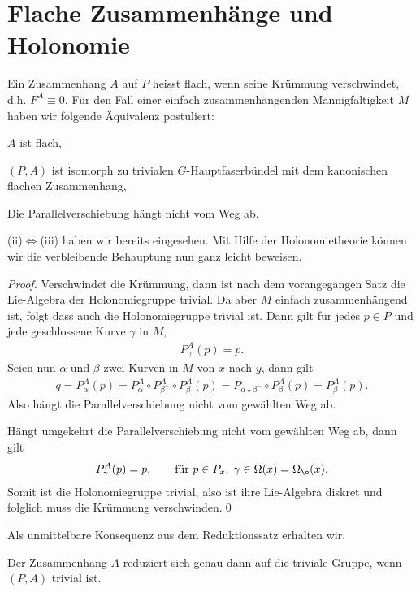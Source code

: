 \documentclass[%
	paper=a5,%
	fleqn,%
	DIV=18,%
	BCOR=0mm,
	fontsize=11pt,
	titlepage=false,%
	bibliography=totoc,
	DIV=18,%
	twoside=true,
	pdftitle=Riemannsche Geometrie,
	pdfauthor=Uwe Semmelmann,
	numbers=noendperiod]%
	{scrbook}
\begin{document}
\section{Flache Zusammenhänge und Holonomie}

Ein Zusammenhang $A$ auf $P$ heisst flach, wenn seine Krümmung verschwindet, d.h. $F^A\equiv 0$. 
Für den Fall einer einfach zusammenhängenden Mannigfaltigkeit $M$ haben wir folgende Äquivalenz postuliert:
\begin{equivenum}
\item $A$ ist flach,
\item $(P,A)$ ist isomorph zu trivialen $G$-Hauptfaserbündel  mit dem kanonischen flachen Zusammenhang,
\item Die Parallelverschiebung hängt nicht vom Weg ab.
\end{equivenum}

(ii)$\iff$(iii) haben wir bereits eingesehen. Mit Hilfe der Holonomietheorie können wir die verbleibende Behauptung nun ganz leicht beweisen.
\begin{proof}
Verschwindet die Krümmung, dann ist nach dem vorangegangen Satz die Lie-Algebra der Holonomiegruppe trivial. Da aber $M$ einfach zusammenhängend ist, folgt dass auch die Holonomiegruppe trivial ist. Dann gilt für jedes $p\in P$ und jede geschlossene Kurve $\gamma$ in $M$, 
\begin{align*}
P_{\gamma}^A(p) = p.
\end{align*}
Seien nun $\alpha$ und $\beta$ zwei Kurven in $M$ von $x$ nach $y$, dann gilt
\begin{align*}
q = P_{\alpha}^A(p) = P_{\alpha}^A\circ P_{\beta^-}^A\circ P_{\beta}^A(p)
= P_{\alpha\star\beta^-}\circ P_{\beta}^A(p)
= P_{\beta}^A(p).
\end{align*}
Also hängt die Parallelverschiebung nicht vom gewählten Weg ab.

Hängt umgekehrt die Parallelverschiebung nicht vom gewählten Weg ab, dann gilt
\begin{align*}
P_{\gamma}^A(p) = p,\qquad  \text{für } p\in P_{x},\; \gamma\in\Omega(x) = \Omega_{\o}(x).
\end{align*}
Somit ist die Holonomiegruppe trivial, also ist ihre Lie-Algebra diskret und folglich muss die Krümmung verschwinden.\qed
\end{proof}

Als unmittelbare Konsequenz aus dem Reduktionssatz erhalten wir.

\begin{cor}
Der Zusammenhang $A$ reduziert sich genau dann auf die triviale Gruppe, wenn $(P,A)$ trivial ist.\fish
\end{cor}
\end{document}
